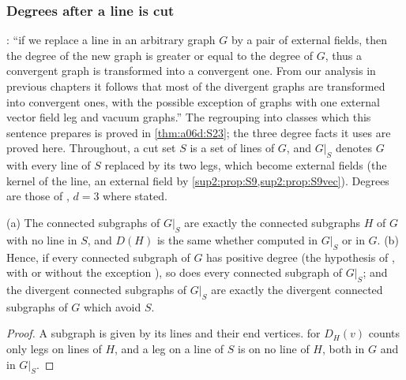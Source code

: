 
\subsubsection{Degrees after a line is cut}\label{sup2:ssec:cut}

\cite[p.~432]{Ba3}: ``if we replace a line in an arbitrary graph $G$ by a pair of external fields, then the degree of the new graph is greater or equal to the degree of $G$, thus a convergent graph is transformed into a convergent one. From our analysis in previous chapters it follows that most of the divergent graphs are transformed into convergent ones, with the possible exception of graphs with one external vector field leg and vacuum graphs.'' The regrouping into classes which this sentence prepares is proved in \cref{thm:a06d:S23}; the three degree facts it uses are proved here. Throughout, a cut set $S$ is a set of lines of $G$, and $G|_S$ denotes $G$ with every line of $S$ replaced by its two legs, which become external fields (the kernel of the line, an external field by \cref{sup2:prop:S9,sup2:prop:S9vec}). Degrees are those of \cite[(2.1)--(2.3)]{Ba3}, $d=3$ where stated.

\begin{lemma}\label{sup2:lem:cut1}
\textup{(a)} The connected subgraphs of $G|_S$ are exactly the connected subgraphs $H$ of $G$ with no line in $S$, and $D(H)$ is the same whether computed in $G|_S$ or in $G$. \textup{(b)} Hence, if every connected subgraph of $G$ has positive degree (the hypothesis of \cite[Prop.~2.1]{Ba3}, with or without the exception \cite[(2.4)]{Ba3}), so does every connected subgraph of $G|_S$; and the divergent connected subgraphs of $G|_S$ are exactly the divergent connected subgraphs of $G$ which avoid $S$.
\end{lemma}

\begin{proof}
A subgraph is given by its lines and their end vertices. \cite[(2.1)]{Ba3} for $D_H(v)$ counts only legs on lines of $H$, and a leg on a line of $S$ is on no line of $H$, both in $G$ and in $G|_S$.
\end{proof}

